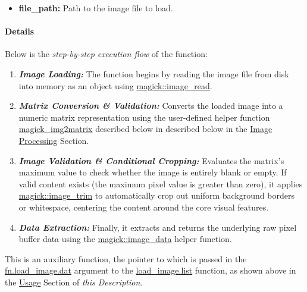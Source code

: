 \documentclass[
]{report}
\providecommand{\tightlist}{%
  \setlength{\itemsep}{0pt}\setlength{\parskip}{0pt}}
\begin{document}
\protect{}\label{func.load.img_trimmed.dat.args.file}
\begin{itemize}
\tightlist
\item
  \textbf{file\_path:} Path to the image file to load.
\end{itemize}

\protect{}\label{func.load.img_trimmed.dat.details}
\paragraph{Details}\label{details-3}

\hfill\break

Below is the \emph{step-by-step execution flow} of the function:

\begin{enumerate}
\def\labelenumi{\arabic{enumi}.}
\item
  \textbf{\emph{Image Loading:}} The function begins by reading the image file from disk into memory as an object using \href{https://docs.ropensci.org/magick/reference/editing.html}{magick::image\_read}.
\item
  \textbf{\emph{Matrix Conversion \& Validation:}} Converts the loaded image into a numeric matrix representation using the user-defined helper function \hyperref[func.magick_img2matrix]{magick\_img2matrix} described below in described below in the \hyperref[appndx_aux40img_proc]{Image Processing} Section.
\item
  \textbf{\emph{Image Validation \& Conditional Cropping:}} Evaluates the matrix's maximum value to check whether the image is entirely blank or empty. If valid content exists (the maximum pixel value is greater than zero), it applies \href{https://docs.ropensci.org/magick/reference/editing.html}{magick::image\_trim} to automatically crop out uniform background borders or whitespace, centering the content around the core visual features.
\item
  \textbf{\emph{Data Extraction:}} Finally, it extracts and returns the underlying raw pixel buffer data using the \href{https://docs.ropensci.org/magick/reference/editing.html\#details}{magick::image\_data} helper function.
\end{enumerate}

\begin{noteblock}
This is an auxiliary function, the pointer to which is passed in the \hyperref[func.load_image.list.args.fn.load_image.dat]{fn.load\_image.dat} argument to the \hyperref[func.load_image.list]{load\_image.list} function, as shown above in the \hyperref[func.load.img_trimmed.dat.usage]{Usage} Section of \emph{this Description}.

\end{noteblock}
\end{document}
